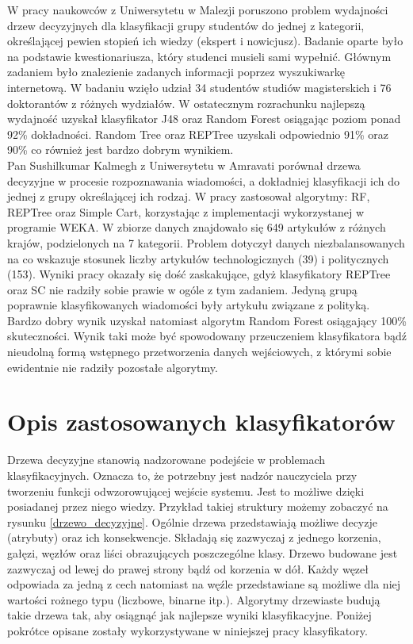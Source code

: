 \documentclass[conference]{IEEEtran}
\begin{document}
\indent W pracy naukowców z Uniwersytetu w Malezji poruszono problem wydajności drzew decyzyjnych dla klasyfikacji grupy studentów do jednej z kategorii, określającej pewien stopień ich wiedzy (ekspert i nowicjusz). Badanie oparte było na podstawie kwestionariusza, który studenci musieli sami wypełnić. Głównym zadaniem było znalezienie zadanych informacji poprzez wyszukiwarkę internetową. W badaniu wzięło udział 34 studentów studiów magisterskich i 76 doktorantów z różnych wydziałów. W ostatecznym rozrachunku najlepszą wydajność uzyskał klasyfikator J48 oraz Random Forest osiągając poziom ponad 92\% dokładności. Random Tree oraz REPTree uzyskali odpowiednio 91\% oraz 90\% co również jest bardzo dobrym wynikiem. \cite{b3} \\
\indent Pan Sushilkumar Kalmegh z Uniwersytetu w Amravati porównał drzewa decyzyjne w procesie rozpoznawania wiadomości, a dokładniej klasyfikacji ich do jednej z grupy określającej ich rodzaj. W pracy zastosował algorytmy: RF, REPTree oraz Simple Cart, korzystając z implementacji wykorzystanej w programie WEKA. W zbiorze danych znajdowało się 	649 artykułów z różnych krajów, podzielonych na 7 kategorii. Problem dotyczył danych niezbalansowanych na co wskazuje stosunek liczby artykułów technologicznych (39) i politycznych (153). Wyniki pracy okazały się dość zaskakujące, gdyż klasyfikatory REPTree oraz SC nie radziły sobie prawie w ogóle z tym zadaniem. Jedyną grupą poprawnie klasyfikowanych wiadomości były artykułu związane z polityką. Bardzo dobry wynik uzyskał natomiast algorytm Random Forest osiągający 100\% skuteczności. Wynik taki może być spowodowany przeuczeniem klasyfikatora bądź nieudolną formą wstępnego przetworzenia danych wejściowych, z którymi sobie ewidentnie nie radziły pozostałe algorytmy.
	
 

\section{Opis zastosowanych klasyfikatorów}
Drzewa decyzyjne stanowią nadzorowane podejście w problemach klasyfikacyjnych. Oznacza to, że potrzebny jest nadzór nauczyciela przy tworzeniu funkcji odwzorowującej wejście systemu. Jest to możliwe dzięki posiadanej przez niego wiedzy.
Przykład takiej struktury możemy zobaczyć na rysunku \ref{drzewo_decyzyjne}. Ogólnie drzewa przedstawiają możliwe decyzje (atrybuty) oraz ich konsekwencje. Składają się zazwyczaj z jednego korzenia, gałęzi, węzłów oraz liści obrazujących poszczególne klasy. Drzewo budowane jest zazwyczaj od lewej do prawej strony bądź od korzenia w dół. Każdy węzeł odpowiada za jedną z cech natomiast na węźle przedstawiane są możliwe dla niej wartości rożnego typu (liczbowe, binarne itp.). Algorytmy drzewiaste budują takie drzewa tak, aby osiągnąć jak najlepsze wyniki klasyfikacyjne. Poniżej pokrótce opisane zostały wykorzystywane w niniejszej pracy klasyfikatory. 
\end{document}
